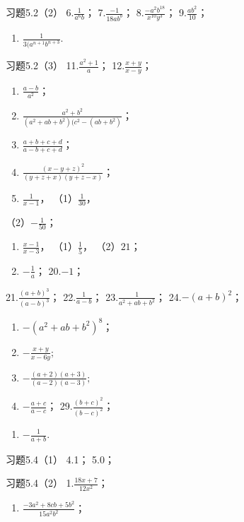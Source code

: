 习题5.2（2） 6.\(\frac{1}{a^6b}\)； 7.\(\frac{-1}{18ab^b}\)；
8.\(\frac{-a^2b^{18}}{x^{10}y^3}\)； 9.\(\frac{ab^2}{10}\)；

\begin{enumerate}[start=10]
\item
  \(\frac{1}{3(a^{n+1}b^{n+3}}.\)
\end{enumerate}

习题5.2（3） 11.\(\frac{a^2 + 1}{a}\)； 12.\(\frac{x + y}{x - y}\)；
\begin{enumerate}[start=13]
\item
  \(\frac{a - b}{a^2}\)；
\item
  \(\frac{a^2 + b^2}{(a^2 + ab + b^2)(c^2 - (ab + b^2)}\)；
\item
  \(\frac{a + b + c + d}{a - b + c + d}\)；
\item
  \(\frac{(x - y + z)^2}{(y + z + x)(y + z - x)}\)；
\item
  \(\frac{1}{x - 1}\)， （1）\(\frac{1}{30}\)，
\end{enumerate}
（2）\(-\frac{1}{50}\)；

\begin{enumerate}[start=18]
\item
  \(\frac{x - 1}{x - 3}\)， （1）\(\frac{1}{5}\)， （2）\(21\)；
\item
  \(-\frac{1}{a}\)； 20.\(-1\)；
\end{enumerate}

21.\(\frac{(a + b)^3}{(a - b)^3}\)； 22.\(\frac{1}{a - b}\)；
23.\(\frac{1}{a^2 + ab + b^2}\)； 24.\(-(a + b)^2\)；

\begin{enumerate}[start=25]
\item
  \(-(a^{2}+ab+b^{2})^{8}\)；
\item
  \(-\frac{x+y}{x-6y};\)
\item
  \(-\frac{(a + 2)(a + 3)}{(a - 2)(a - 3)};\)
\item
  \(-\frac{a+c}{a-c}\)； 29.\(\frac{(b+c)^{2}}{(b-c)^{2}}\)；
\end{enumerate}

\begin{enumerate}[start=30]
\item
  \(-\frac{1}{a+b}.\)
\end{enumerate}

习题5.4（1） 4.1； 5.0；

习题5.4（2） 1.\(\frac{18x + 7}{12x^2}\)；

\begin{enumerate}[start=2]
\item
  \(\frac{-3a^2 + 8cb + 5b^2}{15a^2b^2}\)；
\end{enumerate}

